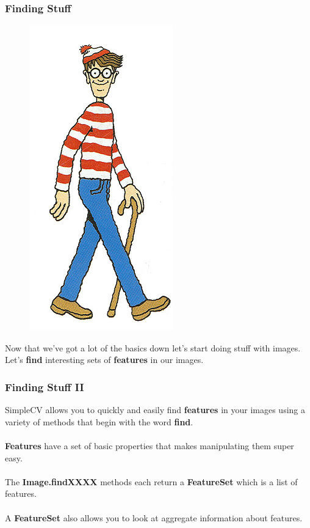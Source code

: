 \documentclass{beamer}
\begin{document}
\begin{frame}
  \frametitle{Finding Stuff}
 \begin{figure}
     \includegraphics[width=0.2\linewidth]{waldo.jpg}
 \end{figure}

Now that we've got a lot of the basics down let's start doing stuff
with images. Let's \textbf{find} interesting sets of \textbf{features} in our images.

\end{frame}
\begin{frame}
  \frametitle{Finding Stuff II}

SimpleCV allows you to quickly and easily find \textbf{features} in
your images using a variety of methods that begin with the word
\textbf{find}. 
\\~\\
\textbf{Features} have a set of basic properties that makes
manipulating them super easy.
\\~\\
The \textbf{Image.findXXXX} methods each return a \textbf{FeatureSet}
which is a list of features.
\\~\\
A \textbf{FeatureSet} also allows you to look at aggregate information
about features.
\end{frame}
\end{document}

